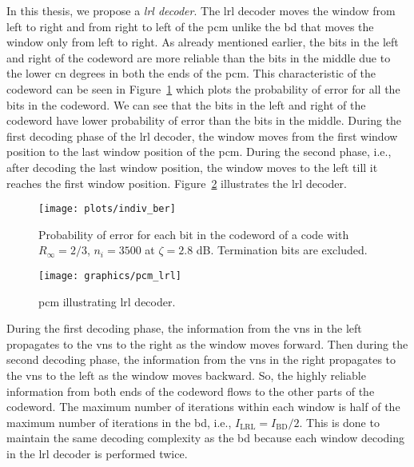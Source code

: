 In this thesis, we propose a \emph{\gls{lrl} decoder}. The \gls{lrl} decoder moves the window from left to right and from right to left of the \gls{pcm} unlike the \gls{bd} that moves the window only from left to right. As already mentioned earlier, the bits in the left and right of the codeword are more reliable than the bits in the middle due to the lower \gls{cn} degrees in both the ends of the \gls{pcm}. This characteristic of the codeword can be seen in Figure~\ref{fig:indiv_ber} which plots the probability of error for all the bits in the codeword. We can see that the bits in the left and right of the codeword have lower probability of error than the bits in the middle. During the first decoding phase of the \gls{lrl} decoder, the window moves from the first window position to the last window position of the \gls{pcm}. During the second phase, i.e., after decoding the last window position, the window moves to the left till it reaches the first window position. Figure~\ref{fig:pcm_lrl} illustrates the \gls{lrl} decoder.
\begin{figure}[htbp]
  \centering
  \texttt{[image: plots/indiv\_ber]}
  \caption[Probability of bit error for \acrshort{bpl} code.]{Probability of error for each bit in the codeword of a code with $R_\infty=2/3$, $n_i=3500$ at $\zeta=2.8$ dB. Termination bits are excluded.}
  \label{fig:indiv_ber}
\end{figure}

\begin{figure}[htbp]
  \centering
  \texttt{[image: graphics/pcm\_lrl]}
  \caption{\gls{pcm} illustrating \gls{lrl} decoder.}
  \label{fig:pcm_lrl}
\end{figure}
During the first decoding phase, the information from the \glspl{vn} in the left propagates to the \glspl{vn} to the right as the window moves forward. Then during the second decoding phase, the information from the \glspl{vn} in the right propagates to the \glspl{vn} to the left as the window moves backward. So, the highly reliable information from both ends of the codeword flows to the other parts of the codeword. The maximum number of iterations within each window is half of the maximum number of iterations in the \gls{bd}, i.e., $I_{\text{LRL}}=I_{\text{BD}}/2$. This is done to maintain the same decoding complexity as the \gls{bd} because each window decoding in the \gls{lrl} decoder is performed twice.

